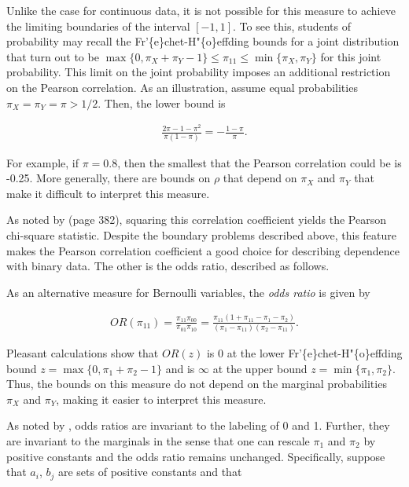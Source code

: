 \documentclass[]{book}
\theoremstyle{definition}
\theoremstyle{definition}
\theoremstyle{definition}
\theoremstyle{remark}
\begin{document}
Unlike the case for continuous data, it is not possible for this measure
to achieve the limiting boundaries of the interval \([-1,1]\). To see
this, students of probability may recall the Fr'\{e\}chet-H"\{o\}effding
bounds for a joint distribution that turn out to be
\(\max\{0, \pi_X+\pi_Y-1\} \le \pi_{11} \le \min\{\pi_X,\pi_Y\}\) for
this joint probability. This limit on the joint probability imposes an
additional restriction on the Pearson correlation. As an illustration,
assume equal probabilities \(\pi_X =\pi_Y = \pi > 1/2\). Then, the lower
bound is

\begin{eqnarray*}
\frac{2\pi - 1 - \pi^2}{\pi(1-\pi)} = -\frac{1-\pi}{\pi} .
\end{eqnarray*}

For example, if \(\pi=0.8\), then the smallest that the Pearson
correlation could be is -0.25. More generally, there are bounds on
\(\rho\) that depend on \(\pi_X\) and \(\pi_Y\) that make it difficult
to interpret this measure.

As noted by \citep{bishop1975discrete} (page 382), squaring this
correlation coefficient yields the Pearson chi-square statistic. Despite
the boundary problems described above, this feature makes the Pearson
correlation coefficient a good choice for describing dependence with
binary data. The other is the odds ratio, described as follows.

As an alternative measure for Bernoulli variables, the \emph{odds ratio}
is given by

\begin{eqnarray*}
OR(\pi_{11}) = \frac{\pi_{11} \pi_{00}}{\pi_{01} \pi_{10}} = \frac{\pi_{11} \left( 1+\pi_{11}-\pi_1 -\pi_2\right)}{(\pi_1-\pi_{11})(\pi_2- \pi_{11})} .
\end{eqnarray*}

Pleasant calculations show that \(OR(z)\) is \(0\) at the lower
Fr'\{e\}chet-H"\{o\}effding bound \(z= \max\{0, \pi_1+\pi_2-1\}\) and is
\(\infty\) at the upper bound \(z=\min\{\pi_1,\pi_2\}\). Thus, the
bounds on this measure do not depend on the marginal probabilities
\(\pi_X\) and \(\pi_Y\), making it easier to interpret this measure.

As noted by \citep{yule1900association}, odds ratios are invariant to
the labeling of 0 and 1. Further, they are invariant to the marginals in
the sense that one can rescale \(\pi_1\) and \(\pi_2\) by positive
constants and the odds ratio remains unchanged. Specifically, suppose
that \(a_i\), \(b_j\) are sets of positive constants and that
\end{document}
